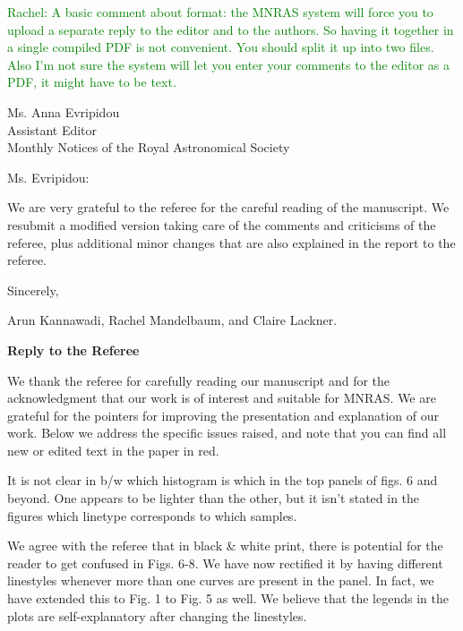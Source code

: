 \documentclass[english]{letter}
\newcommand{\rachel}[1]{\textrm{\textcolor{green}{Rachel: #1}}}
\begin{document}
\date{\today}

\rachel{A basic comment about format: the MNRAS system will force you to upload a separate reply to
  the editor and to the authors.  So having it together in a single compiled PDF is not convenient.
  You should split it up into two files.  Also I'm not sure the system will let you enter your
  comments to the editor as a PDF, it might have to be text.}


\begin{letter}{Ms. Anna Evripidou\\ Assistant Editor\\ Monthly Notices of the 
Royal Astronomical Society}

\opening{Ms. Evripidou:}

We are very grateful to the referee for the careful reading of the manuscript.
We resubmit a modified version taking care of the comments and criticisms of the referee, plus
additional minor changes that are also explained in the report to the referee.

\closing{Sincerely,}
Arun Kannawadi, Rachel Mandelbaum, and Claire Lackner.
\end{letter}
\vspace{20pt}
{\bf Reply to the Referee}

We thank the referee for carefully reading our manuscript and for the acknowledgment that our work is of interest
and suitable for MNRAS. We are grateful for the pointers for improving the presentation and
explanation of our work. 
Below we address the specific issues raised, and note that you can find all new or edited text in
the paper in red.

\begin{shaded}
It is not clear in b/w which histogram is which in the top panels of figs. 6 and beyond. One appears to be lighter than the other, but it isn't stated in the figures which linetype corresponds to which samples.
\end{shaded}
\noindent
We agree with the referee that in black \& white print, there is potential for the reader to get confused in Figs. 6-8.
We have now rectified it by having different linestyles whenever more than one curves are present in the panel. In fact, we have extended this to Fig. 1 to Fig. 5 as well. We believe that the legends in the plots are self-explanatory after changing the linestyles.
\end{document}
